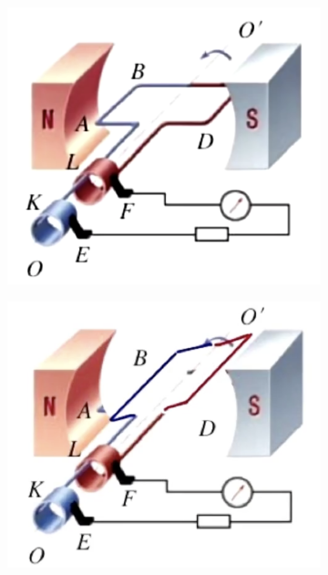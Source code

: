 \documentclass{article}
\begin{document}
\begin{enumerate}
\begin{enumerate}[label=(\arabic*)]
\begin{figure}[h]
                        \begin{subfigure}{0.4\textwidth}
                            \centering
                            \includegraphics[width=\textwidth,keepaspectratio]{pictures/1.1-1.png}
                            \caption{} %
                        \end{subfigure}
                        \hfill %
                        \begin{subfigure}{0.4\textwidth}
                            \centering
                            \includegraphics[width=\textwidth,keepaspectratio]{pictures/1.1-2.png}
                            \caption{} %
                        \end{subfigure}
                    \end{figure}


\end{enumerate}
\end{enumerate}
\end{document}
